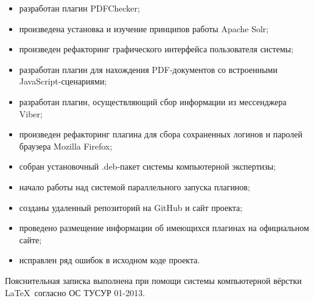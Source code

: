 \begin{itemize}
  \item разработан плагин PDFChecker;
  \item произведена установка и изучение принципов работы Apache Solr; 
  \item произведен рефакторинг графического интерфейса пользователя системы;
  \item разработан плагин для нахождения PDF-документов со встроенными JavaScript-сценариями;
  \item разработан плагин, осуществляющий сбор информации из мессенджера Viber;  
  \item произведен рефакторинг плагина для сбора сохраненных логинов и паролей браузера Mozilla Firefox;  
  \item собран установочный .deb-пакет системы компьютерной экспертизы;  
  \item начало работы над системой параллельного запуска плагинов; 
  \item созданы удаленный репозиторий на GitHub и сайт проекта;  
  \item проведено размещение информации об имеющихся плагинах на официальном сайте;
  \item исправлен ряд ошибок в исходном коде проекта.
\end{itemize}

Пояснительная записка выполнена при помощи системы компьютерной вёрстки \LaTeX\ согласно ОС ТУСУР 01-2013.~\cite{ostusur}
